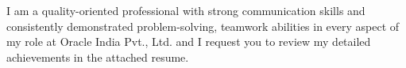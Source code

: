 I am a quality-oriented professional with strong communication skills and consistently demonstrated problem-solving, teamwork abilities in every aspect of my role at Oracle India Pvt., Ltd. and I request you to review my detailed achievements in the attached resume.
